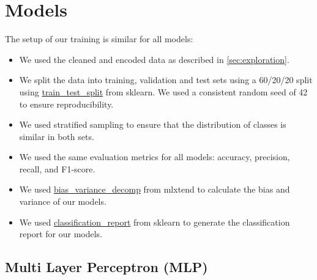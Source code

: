 \section{Models}

The setup of our training is similar for all models:
\begin{itemize}
\item We used the cleaned and encoded data as described in \ref{sec:exploration}.
\item We split the data into training, validation and test sets using a 60/20/20 split using \href{https://scikit-learn.org/stable/modules/generated/sklearn.model_selection.train_test_split.html}{train\_test\_split} from sklearn. We used a consistent random seed of 42 to ensure reproducibility.
\item We used stratified sampling to ensure that the distribution of classes is similar in both sets.
\item We used the same evaluation metrics for all models: accuracy, precision, recall, and F1-score.
\item We used \href{https://rasbt.github.io/mlxtend/user_guide/evaluate/bias_variance_decomp/}{bias\_variance\_decomp} from mlxtend to calculate the bias and variance of our models.
\item We used \href{https://scikit-learn.org/stable/modules/generated/sklearn.metrics.classification_report.html}{classification\_report} from sklearn to generate the classification report for our models.
\end{itemize}

\subsection{Multi Layer Perceptron (MLP)}


